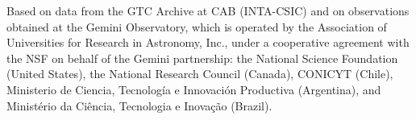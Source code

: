 \documentclass[referee]{aa}
\begin{document}
\begin{acknowledgements}
%
Based on data from the GTC Archive at CAB (INTA-CSIC) and on observations obtained at the Gemini Observatory, which is operated by the Association of Universities for Research in Astronomy, Inc., under a cooperative agreement with the NSF on behalf of the Gemini partnership: the National Science Foundation (United States), the National Research Council (Canada), CONICYT (Chile), Ministerio de Ciencia, Tecnología e Innovación Productiva (Argentina), and Ministério da Ciência, Tecnologia e Inovação (Brazil).

\end{acknowledgements}



\end{document}
